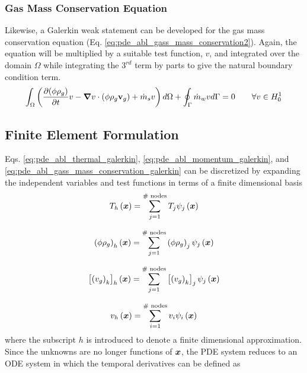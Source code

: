 \subsubsection{Gas Mass Conservation Equation}
Likewise, a Galerkin weak statement can be developed for the gas mass conservation equation (Eq. \ref{eq:pde_abl_gass_mass_conservation2}).
Again, the equation will be multiplied  by a suitable test function, $v$, and integrated over the domain $\Omega$ while integrating the
$\text{3}^{rd}$ term by parts to give the natural boundary condition term.
\begin{equation}
  \int_{\Omega} \left( \pdv{\left( \phi \rho_{g} \right)}{t} v - \grad{v} \cdot \left( \phi \rho_{g} \mathbf{v}_{g} \right)  + \dot{m}_{s} v \right) d \Omega + \oint_{\Gamma} \dot{m}_{w} v d \Gamma = 0 \hspace{2eM} \forall v \in H_0^1
  \label{eq:pde_abl_gass_mass_conservation_galerkin}
\end{equation}

\subsection{Finite Element Formulation}
Eqs. \ref{eq:pde_abl_thermal_galerkin}, \ref{eq:pde_abl_momentum_galerkin},  and \ref{eq:pde_abl_gass_mass_conservation_galerkin} can be discretized by expanding the independent variables and test functions in terms of a finite dimensional basis
\begin{equation}
  T_{h}\left({\boldsymbol{x}}\right) = \sum_{j=1}^{\text{\# nodes}} T_{j} \psi_{j}\left({\boldsymbol{x}}\right)
  \label{eq:T_of_x}
\end{equation}

\begin{equation}
  \left( \phi \rho_{g} \right)_{h}\left({\boldsymbol{x}}\right) = \sum_{j=1}^{\text{\# nodes}} \left( \phi \rho_{g} \right)_{j} \psi_{j}\left({\boldsymbol{x}}\right)
\end{equation}

\begin{equation}
  \left[\left(v_{g}\right)_{k}\right]_{h}\left({\boldsymbol{x}}\right) = \sum_{j=1}^{\text{\# nodes}} \left[\left(v_{g}\right)_{k}\right]_{j} \psi_{j}\left({\boldsymbol{x}}\right)
\end{equation}

\begin{equation}
  v_{h}\left({\boldsymbol{x}}\right) = \sum_{i=1}^{\text{\# nodes}} v_{i} \psi_{i}\left({\boldsymbol{x}}\right)
\end{equation}
where the subscript $h$ is introduced to denote a finite dimensional approximation.  Since the unknowns are no longer functions of ${\boldsymbol{x}}$, the PDE system reduces to an ODE system in which the temporal derivatives can be defined as

